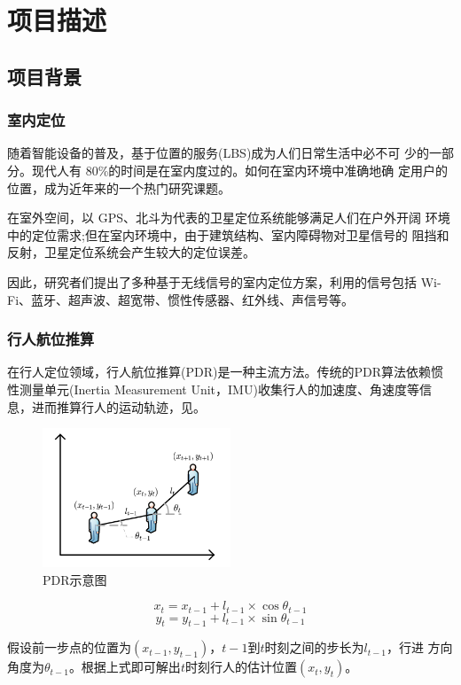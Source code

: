 \documentclass[a4paper]{article}
\begin{document}
\section{项目描述}
\subsection{项目背景}
\subsubsection{室内定位}
随着智能设备的普及，基于位置的服务(LBS)成为人们日常生活中必不可 少的一部分。现代人有 80\%的时间是在室内度过的。如何在室内环境中准确地确 定用户的位置，成为近年来的一个热门研究课题。

在室外空间，以 GPS、北斗为代表的卫星定位系统能够满足人们在户外开阔 环境中的定位需求;但在室内环境中，由于建筑结构、室内障碍物对卫星信号的 阻挡和反射，卫星定位系统会产生较大的定位误差。

因此，研究者们提出了多种基于无线信号的室内定位方案，利用的信号包括 Wi-Fi、蓝牙、超声波、超宽带、惯性传感器、红外线、声信号等。

\subsubsection{行人航位推算}
在行人定位领域\cite{qbz}，行人航位推算(PDR\cite{li2019rmaptafa})是一种主流方法。传统的PDR算法依赖惯性测量单元(Inertia Measurement Unit，IMU)收集行人的加速度、角速度等信息，进而推算行人的运动轨迹，见。

\begin{figure}[htbp]
	\centering
	\includegraphics[width=0.5\textwidth]{fig/pdr.png}
	\caption{PDR示意图}
	\label{pdrfig}
\end{figure}

$$ x_t = x_{t-1} + l_{t-1} \times \cos \theta_{t-1} $$
$$ y_t = y_{t-1} + l_{t-1} \times \sin \theta_{t-1} $$

假设前一步点的位置为$(x_{t-1},y_{t-1})$，$t-1$到$t$时刻之间的步长为$l_{t-1}$，行进
方向角度为$\theta_{t-1}$。根据上式即可解出$t$时刻行人的估计位置$(x_t, y_t)$。
\end{document}
